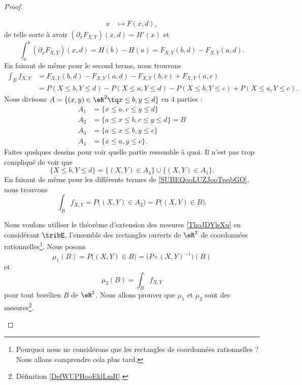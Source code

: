 \begin{proof}
\begin{subproof}
\begin{equation}
\begin{aligned}
				x           & \mapsto F(x,d),
			\end{aligned}
		\end{equation}
		de telle sorte à avoir \( (\partial_xF_{X,Y})(x,d)=H'(x)\) et
		\begin{equation}
			\int_a^b(\partial_xF_{X,Y})(x,d)=H(b)-H(a)=F_{X,Y}(b,d)-F_{X,Y}(a,d).
		\end{equation}
		En faisant de même pour le second terme, nous trouvons
		\begin{subequations}
			\begin{align}
				\int_Bf_{X,Y} & =F_{X,Y}(b,d)-F_{X,Y}(a,d)-F_{X,Y}(b,c)+F_{X,Y}(a,c)                                                      \\
				              & =P(X\leq b,Y\leq d)-P(X\leq a,Y\leq d)-P(X\leq b,Y\leq c)+P(X\leq a,Y\leq c).	\label{SUBEQooLUZJooTpqbGO}
			\end{align}
		\end{subequations}
		Nous divisons \( A=\{ (x,y)\in \eR^2\tq x\leq b,y\leq d \}\) en \( 4\) parties :
		\begin{subequations}
			\begin{align}
				A_1 & =\{ x\leq a,c\leq y\leq d \}         \\
				A_2 & =\{ a\leq x\leq b,c\leq y\leq d \}=B \\
				A_3 & =\{ a\leq x\leq b,y\leq c \}         \\
				A_4 & =\{ x\leq a,y\leq c \}.
			\end{align}
		\end{subequations}
		Faites quelques dessins pour voir quelle partie ressemble à quoi. Il n'est pas trop compliqué de voir que
		\begin{equation}
			\{ X\leq b,Y\leq d \}=\{ (X,Y)\in A_4 \}\cup\{ (X,Y)\in A_1 \}.
		\end{equation}
		En faisant de même pour les différents termes de \eqref{SUBEQooLUZJooTpqbGO}, nous trouvons
		\begin{equation}
			\int_Bf_{X,Y}=P\big( (X,Y)\in A_2 \big)=P\big( (X,Y)\in B \big).
		\end{equation}

		Nous voulons utiliser le théorème d'extension des mesures \ref{ThoJDYlsXu} en considérant \( \tribE\), l'ensemble des rectangles ouverts de \( \eR^2\) de coordonnées rationnelles\footnote{Pourquoi nous ne considérons que les rectangles de coordonnées rationnelles ? Nous allons comprendre cela plus tard.}. Nous posons
		\begin{equation}		\label{EQooPFXUooOumsUl}
			\mu_1(B)=P\big( (X,Y)\in B \big)=\big( P\circ (X,Y)^{-1} \big)(B)
		\end{equation}
		et
		\begin{equation}
			\mu_2(B)=\int_Bf_{X,Y}
		\end{equation}
		pour tout borélien \( B\) de \( \eR^2\). Nous allons prouver que \( \mu_1\) et \( \mu_2\) sont des mesures\footnote{Définition \ref{DefWUPHooEklLmR}.}.


\end{subproof}
\end{proof}
